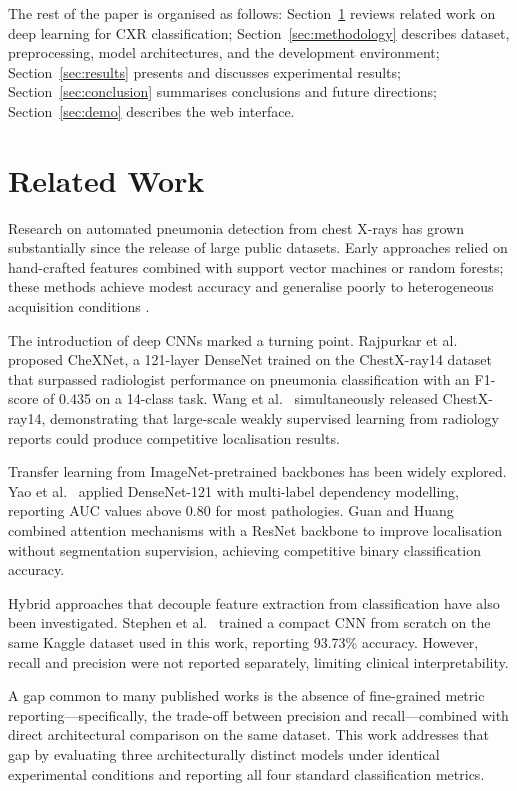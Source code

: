 \documentclass[conference]{IEEEtran}
\begin{document}
The rest of the paper is organised as follows: Section~\ref{sec:related}
reviews related work on deep learning for CXR classification;
Section~\ref{sec:methodology} describes dataset, preprocessing,
model architectures, and the development environment;
Section~\ref{sec:results} presents and discusses experimental
results; Section~\ref{sec:conclusion} summarises conclusions and
future directions; Section~\ref{sec:demo} describes the web
interface.

\section{Related Work}
\label{sec:related}

Research on automated pneumonia detection from chest X-rays
has grown substantially since the release of large public
datasets. Early approaches relied on hand-crafted features
combined with support vector machines or random forests; these
methods achieve modest accuracy and generalise poorly to
heterogeneous acquisition conditions \cite{jaeger2014}.

The introduction of deep CNNs marked a turning point.
Rajpurkar et al.\ \cite{rajpurkar2017} proposed CheXNet,
a 121-layer DenseNet trained on the ChestX-ray14 dataset
that surpassed radiologist performance on pneumonia
classification with an F1-score of 0.435 on a 14-class task.
Wang et al.\ \cite{wang2017} simultaneously released
ChestX-ray14, demonstrating that large-scale weakly
supervised learning from radiology reports could produce
competitive localisation results.

Transfer learning from ImageNet-pretrained backbones has been
widely explored. Yao et al.\ \cite{yao2018} applied DenseNet-121
with multi-label dependency modelling, reporting AUC values
above 0.80 for most pathologies. Guan and Huang \cite{guan2019}
combined attention mechanisms with a ResNet backbone to
improve localisation without segmentation supervision,
achieving competitive binary classification accuracy.

Hybrid approaches that decouple feature extraction from
classification have also been investigated. Stephen et al.\
\cite{stephen2019} trained a compact CNN from scratch on the
same Kaggle dataset used in this work, reporting 93.73\%
accuracy. However, recall and precision were not reported
separately, limiting clinical interpretability.

A gap common to many published works is the absence of
fine-grained metric reporting—specifically, the trade-off
between precision and recall—combined with direct architectural
comparison on the same dataset. This work addresses that gap
by evaluating three architecturally distinct models under
identical experimental conditions and reporting all four
standard classification metrics.
\end{document}
